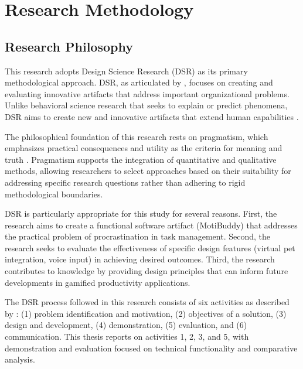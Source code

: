 
\chapter{Research Methodology}
\label{chap:methodology}

\section{Research Philosophy}
\label{sec:research-philosophy}

\completed

This research adopts Design Science Research (DSR) as its primary methodological approach. DSR, as articulated by \citet{hevner2004design}, focuses on creating and evaluating innovative artifacts that address important organizational problems. Unlike behavioral science research that seeks to explain or predict phenomena, DSR aims to create new and innovative artifacts that extend human capabilities \citep{hevner2010design}.

The philosophical foundation of this research rests on pragmatism, which emphasizes practical consequences and utility as the criteria for meaning and truth \citep{goldkuhl2004design}. Pragmatism supports the integration of quantitative and qualitative methods, allowing researchers to select approaches based on their suitability for addressing specific research questions rather than adhering to rigid methodological boundaries.

DSR is particularly appropriate for this study for several reasons. First, the research aims to create a functional software artifact (MotiBuddy) that addresses the practical problem of procrastination in task management. Second, the research seeks to evaluate the effectiveness of specific design features (virtual pet integration, voice input) in achieving desired outcomes. Third, the research contributes to knowledge by providing design principles that can inform future developments in gamified productivity applications.

The DSR process followed in this research consists of six activities as described by \citet{peffers2007design}: (1) problem identification and motivation, (2) objectives of a solution, (3) design and development, (4) demonstration, (5) evaluation, and (6) communication. This thesis reports on activities 1, 2, 3, and 5, with demonstration and evaluation focused on technical functionality and comparative analysis.

